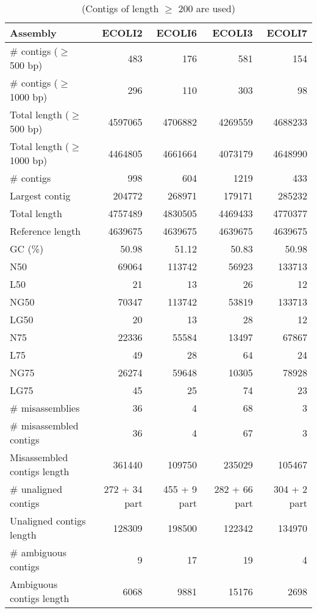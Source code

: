 \begin{table}[ht]
\begin{center}
\caption{(Contigs of length $\geq$ 200 are used)}
\begin{tabular}{|l*{4}{|r}|}
\hline
Assembly & ECOLI2 & ECOLI6 & ECOLI3 & ECOLI7 \\ \hline
\# contigs ($\geq$ 500 bp) & 483 & 176 & 581 & 154 \\ \hline
\# contigs ($\geq$ 1000 bp) & 296 & 110 & 303 & 98 \\ \hline
Total length ($\geq$ 500 bp) & 4597065 & 4706882 & 4269559 & 4688233 \\ \hline
Total length ($\geq$ 1000 bp) & 4464805 & 4661664 & 4073179 & 4648990 \\ \hline
\# contigs & 998 & 604 & 1219 & 433 \\ \hline
Largest contig & 204772 & 268971 & 179171 & 285232 \\ \hline
Total length & 4757489 & 4830505 & 4469433 & 4770377 \\ \hline
Reference length & 4639675 & 4639675 & 4639675 & 4639675 \\ \hline
GC (\%) & 50.98 & 51.12 & 50.83 & 50.98 \\ \hline
N50 & 69064 & 113742 & 56923 & 133713 \\ \hline
L50 & 21 & 13 & 26 & 12 \\ \hline
NG50 & 70347 & 113742 & 53819 & 133713 \\ \hline
LG50 & 20 & 13 & 28 & 12 \\ \hline
N75 & 22336 & 55584 & 13497 & 67867 \\ \hline
L75 & 49 & 28 & 64 & 24 \\ \hline
NG75 & 26274 & 59648 & 10305 & 78928 \\ \hline
LG75 & 45 & 25 & 74 & 23 \\ \hline
\# misassemblies & 36 & 4 & 68 & 3 \\ \hline
\# misassembled contigs & 36 & 4 & 67 & 3 \\ \hline
Misassembled contigs length & 361440 & 109750 & 235029 & 105467 \\ \hline
\# unaligned contigs & 272 + 34 part & 455 + 9 part & 282 + 66 part & 304 + 2 part \\ \hline
Unaligned contigs length & 128309 & 198500 & 122342 & 134970 \\ \hline
\# ambiguous contigs & 9 & 17 & 19 & 4 \\ \hline
Ambiguous contigs length & 6068 & 9881 & 15176 & 2698 \\ \hline

\end{tabular}
\end{center}
\end{table}
